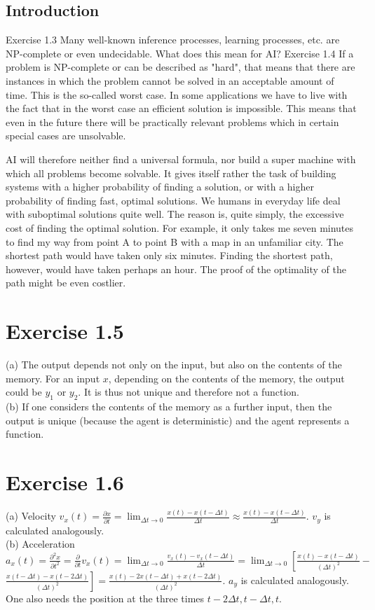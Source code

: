 \documentclass[10pt]{book}
\begin{document}
\subsection{Introduction}
Exercise 1.3 Many well-known inference processes, learning processes, etc. are NP-complete or even undecidable. What does this mean for AI?
Exercise 1.4 If a problem is NP-complete or can be described as "hard", that means that there are instances in which the problem cannot be solved in an acceptable amount of time. This is the so-called worst case. In some applications we have to live with the fact that in the worst case an efficient solution is impossible. This means that even in the future there will be practically relevant problems which in certain special cases are unsolvable.

AI will therefore neither find a universal formula, nor build a super machine with which all problems become solvable. It gives itself rather the task of building systems with a higher probability of finding a solution, or with a higher probability of finding fast, optimal solutions. We humans in everyday life deal with suboptimal solutions quite well. The reason is, quite simply, the excessive cost of finding the optimal solution. For example, it only takes me seven minutes to find my way from point A to point B with a map in an unfamiliar city. The shortest path would have taken only six minutes. Finding the shortest path, however, would have taken perhaps an hour. The proof of the optimality of the path might be even costlier.

\section{Exercise 1.5}
(a) The output depends not only on the input, but also on the contents of the memory. For an input $x$, depending on the contents of the memory, the output could be $y_{1}$ or $y_{2}$. It is thus not unique and therefore not a function.\\
(b) If one considers the contents of the memory as a further input, then the output is unique (because the agent is deterministic) and the agent represents a function.

\section{Exercise 1.6}
(a) Velocity $v_{x}(t)=\frac{\partial x}{\partial t}=\lim _{\Delta t \rightarrow 0} \frac{x(t)-x(t-\Delta t)}{\Delta t} \approx \frac{x(t)-x(t-\Delta t)}{\Delta t}$. $v_{y}$ is calculated analogously.\\
(b) Acceleration $a_{x}(t)=\frac{\partial^{2} x}{\partial t^{2}}=\frac{\partial}{\partial t} v_{x}(t)=\lim _{\Delta t \rightarrow 0} \frac{v_{x}(t)-v_{x}(t-\Delta t)}{\Delta t}=\lim _{\Delta t \rightarrow 0}\left[\frac{x(t)-x(t-\Delta t)}{(\Delta t)^{2}}-\right.$ $\left.\frac{x(t-\Delta t)-x(t-2 \Delta t)}{(\Delta t)^{2}}\right]=\frac{x(t)-2 x(t-\Delta t)+x(t-2 \Delta t)}{(\Delta t)^{2}}$. $a_{y}$ is calculated analogously. One also needs the position at the three times $t-2 \Delta t, t-\Delta t, t$.
\end{document}

